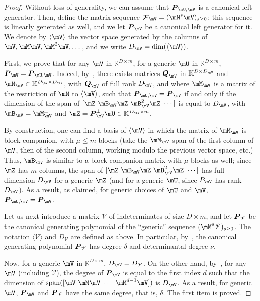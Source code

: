 \documentclass[12pt]{article}
\newcommand{\mat}[1]{\bm{\MakeUppercase{#1}}} %
\newcommand{\seq}{\mat{\mathcal{F}}} %
\def\K{\mathbb{K}}
\def\K {\ensuremath{\mathbb{K}}}
\def\scrV {\ensuremath{\mathscr{V}}}
\begin{document}
\begin{proof}
  Without loss of generality, we can assume that
  $\mat{P}_{\mU,\mV}$ is a canonical left generator. Then, define
  the matrix sequence $\seq_{\mV} = (\mM^s \mV)_{s \ge 0}$; this
  sequence is linearly generated as well, and we let
  $\mat{P}_{\mV}$ be a canonical left generator for it.
  We denote by $\langle \mV \rangle$ the vector space generated by the
  columns of $\mV,\mM\mV,\mM^2\mV,\dots$, and we write
  $D_\mV=\dim(\langle \mV \rangle)$.
	
  First, we prove that for any $\mV$ in $\K^{D \times m}$, for a
  generic $\mU$ in $\K^{D\times m}$,
  $\mat{P}_{\mV}=\mat{P}_{\mU,\mV}$.  Indeed,
  by~\cite[Lemma~4.2]{Villard97a}, there exists matrices $\mat{Q}_\mV$
  in $\K^{D\times D_\mV}$ and $\mM_\mV \in \K^{D_\mV \times D_\mV}$, with
  $\mat{Q}_\mV$ of full rank $D_\mV$, and where $\mM_\mV$ is a matrix of the
  restriction of $\mM$ to $\langle \mV \rangle$, such that
  $\mat{P}_{\mU,\mV}=\mat{P}_{\mV}$ if and only if the
  dimension of the span of $[\mZ ~ \mB_\mV \mZ ~\mB_\mV^2 \mZ ~ \cdots]$
  is equal to $D_\mV$, with $\mB_\mV=\mM_\mV^\perp$ and $\mZ=\mat{P}_\mV^\perp
  \mU \in \K^{D_\mV \times m}$.
	
  By construction, one can find a basis of $\langle \mV \rangle$ in
  which the matrix of $\mM_\mV$ is block-companion, with $\mu \le m$
  blocks (take the $\mM_\mV$-span of the first column of $\mV$, then of
  the second column, working modulo the previous vector space, etc.)
  Thus, $\mB_\mV$ is similar to a block-companion matrix with $\mu$
  blocks as well; since $\mZ$ has $m$ columns, the span of $[\mZ ~
    \mB_\mV \mZ ~\mB_\mV^2 \mZ ~ \cdots]$ has full dimension $D_\mV$ for a
  generic $\mZ$ (and for a generic $\mU$, since $P_\mV$ has rank
  $D_\mV$). As a result, as claimed, for generic choices of $\mU$ and $\mV$,
  $\mat{P}_{\mU,\mV}=\mat{P}_{\mV}$.
	
  Let us next introduce a matrix $\scrV$ of indeterminates of size $D
  \times m$, and let $\mat{P}_{\scrV}$ be the canonical generating
  polynomial of the ``generic'' sequence $(\mM^s \scrV)_{s \ge
    0}$. The notation $\langle \scrV \rangle$ and $D_\scrV$ are
  defined as above.  In particular,
  by~\cite[Proposition~6.1]{Villard97a}, the canonical generating
  polynomial $\mat{P}_{\scrV}$ has degree $\delta$ and determinantal
  degree $\nu$.
  
  Now, for a generic $\mV$ in $\K^{D\times m}$, $D_\mV=D_\scrV$. On the
  other hand, by~\cite[Lemma~4.3]{Villard97a}, for any $\mV$
  (including $\scrV$), the degree of $\mat{P}_{\mV}$ is equal to
  the first index $d$ such that the dimension of ${\rm span}([\mV ~ \mM \mV ~
    \cdots ~\mM^{d-1} \mV])$ is $D_\mV$. As a result, for generic $\mV$,
  $\mat{P}_{\mV}$ and $\mat{P}_{\scrV}$ have the same degree,
  that is, $\delta$.  The first item is proved.
	

\end{proof}
\end{document}
